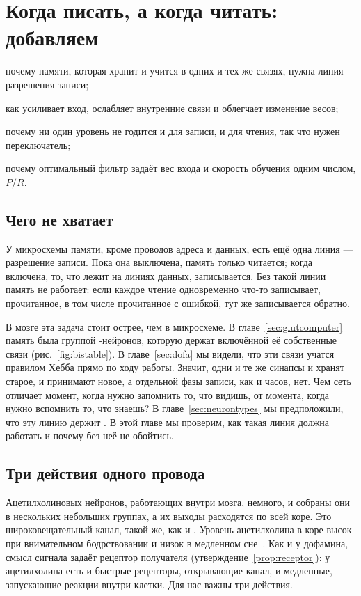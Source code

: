 \chapter{Когда писать, а когда читать: добавляем }
\label{sec:acet}
\begin{chaptergoals}
\item почему памяти, которая хранит и учится в одних и тех же связях, нужна линия разрешения записи;
\item как  усиливает вход, ослабляет внутренние связи и облегчает изменение весов;
\item почему ни один уровень  не годится и для записи, и для чтения, так что нужен переключатель;
\item почему оптимальный фильтр задаёт вес входа и скорость обучения одним числом, $P/R$.
\end{chaptergoals}

\section{Чего не хватает}

У микросхемы памяти, кроме проводов адреса и данных, есть ещё одна линия --- разрешение записи. Пока она выключена, память только читается; когда включена, то, что лежит на линиях данных, записывается. Без такой линии память не работает: если каждое чтение одновременно что-то записывает, прочитанное, в том числе прочитанное с ошибкой, тут же записывается обратно.

В мозге эта задача стоит острее, чем в микросхеме. В главе~\ref{sec:glutcomputer} память была группой -нейронов, которую держат включённой её собственные связи (рис.~\ref{fig:bistable}). В главе~\ref{sec:dofa} мы видели, что эти связи учатся правилом Хебба прямо по ходу работы. Значит, одни и те же синапсы и хранят старое, и принимают новое, а отдельной фазы записи, как и часов, нет. Чем сеть отличает момент, когда нужно запомнить то, что видишь, от момента, когда нужно вспомнить то, что знаешь? В главе~\ref{sec:neurontypes} мы предположили, что эту линию держит . В этой главе мы проверим, как такая линия должна работать и почему без неё не обойтись.

\section{Три действия одного провода}

Ацетилхолиновых нейронов, работающих внутри мозга, немного, и собраны они в нескольких небольших группах, а их выходы расходятся по всей коре. Это широковещательный канал, такой же, как  и . Уровень ацетилхолина в коре высок при внимательном бодрствовании и низок в медленном сне~\cite{Hasselmo1999}. Как и у дофамина, смысл сигнала задаёт рецептор получателя (утверждение~\ref{prop:receptor}): у ацетилхолина есть и быстрые рецепторы, открывающие канал, и медленные, запускающие реакции внутри клетки. Для нас важны три действия.

